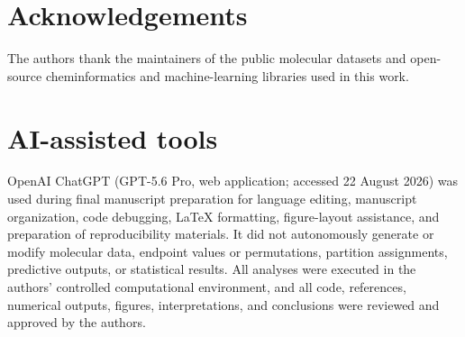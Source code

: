 \section*{Acknowledgements}
The authors thank the maintainers of the public molecular datasets and open-source cheminformatics and machine-learning libraries used in this work.
\fi

\section*{AI-assisted tools}
OpenAI ChatGPT (GPT-5.6 Pro, web application; accessed 22 August 2026) was used during final manuscript preparation for language editing, manuscript organization, code debugging, LaTeX formatting, figure-layout assistance, and preparation of reproducibility materials. It did not autonomously generate or modify molecular data, endpoint values or permutations, partition assignments, predictive outputs, or statistical results. All analyses were executed in the authors' controlled computational environment, and all code, references, numerical outputs, figures, interpretations, and conclusions were reviewed and approved by the authors.


